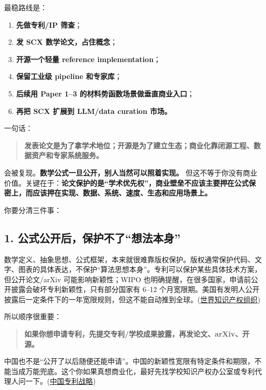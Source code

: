 \documentclass[
  12pt,
]{ctexart}
\providecommand{\tightlist}{%
  \setlength{\itemsep}{0pt}\setlength{\parskip}{0pt}}
\begin{document}
最稳路线是：

\begin{enumerate}
\def\labelenumi{\arabic{enumi}.}
\tightlist
\item
  \textbf{先做专利/IP 筛查}；
\item
  \textbf{发 SCX 数学论文，占住概念}；
\item
  \textbf{开源一个轻量 reference implementation}；
\item
  \textbf{保留工业级 pipeline 和专家库}；
\item
  \textbf{后续用 Paper 1--3 的材料势函数场景做垂直商业入口}；
\item
  \textbf{再把 SCX 扩展到 LLM/data curation 市场。}
\end{enumerate}

一句话：

\begin{quote}
\textbf{发表论文是为了拿学术地位；开源是为了建立生态；商业化靠闭源工程、数据资产和专家系统服务。}
\end{quote}

会被复现。\textbf{数学公式一旦公开，别人当然可以照着实现。}
但这不等于你没有商业价值。关键在于：\textbf{论文保护的是``学术优先权''，商业壁垒不应该主要押在公式保密上，而应该押在实现、数据、系统、速度、生态和应用场景上。}

你要分清三件事：

\subsection{1.
公式公开后，保护不了``想法本身''}\label{ux516cux5f0fux516cux5f00ux540eux4fddux62a4ux4e0dux4e86ux60f3ux6cd5ux672cux8eab}

数学定义、抽象思想、公式框架，本来就很难靠版权保护。版权通常保护代码、文字、图表的具体表达，不保护``算法思想本身''。专利可以保护某些具体技术方案，但公开论文/arXiv
可能影响新颖性；WIPO
也明确提醒，在很多国家，申请前公开披露会破坏专利新颖性，只有部分国家有
6--12
个月宽限期。美国有发明人公开披露后一定条件下的一年宽限规则，但这不能自动推到全球。(\href{https://arxiv.org/html/2406.17557v1?utm_source=chatgpt.com}{世界知识产权组织})

所以顺序很重要：

\begin{quote}
\textbf{如果你想申请专利，先提交专利/学校成果披露，再发论文、arXiv、开源。}
\end{quote}

中国也不是``公开了以后随便还能申请''。中国的新颖性宽限有特定条件和期限，不能当成万能兜底。这个你如果真想商业化，最好先找学校知识产权办公室或专利代理人问一下。(\href{https://arxiv.org/abs/2501.07314?utm_source=chatgpt.com}{中国专利战略})
\end{document}

